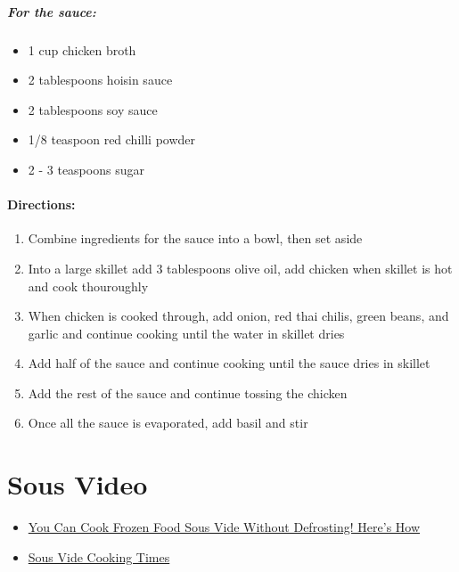 \documentclass[
]{article}
\providecommand{\tightlist}{%
  \setlength{\itemsep}{0pt}\setlength{\parskip}{0pt}}
\begin{document}
\hypertarget{for-the-sauce}{%
\subsubsection{For the sauce:}\label{for-the-sauce}}

\begin{itemize}
\tightlist
\item
  1 cup chicken broth
\item
  2 tablespoons hoisin sauce
\item
  2 tablespoons soy sauce
\item
  1/8 teaspoon red chilli powder
\item
  2 - 3 teaspoons sugar
\end{itemize}

\hypertarget{directions-1}{%
\subsection{Directions:}\label{directions-1}}

\begin{enumerate}
\def\labelenumi{\arabic{enumi}.}
\tightlist
\item
  Combine ingredients for the sauce into a bowl, then set aside
\item
  Into a large skillet add 3 tablespoons olive oil, add chicken when skillet is hot and cook thouroughly
\item
  When chicken is cooked through, add onion, red thai chilis, green beans, and garlic and continue cooking until the water in skillet dries
\item
  Add half of the sauce and continue cooking until the sauce dries in skillet
\item
  Add the rest of the sauce and continue tossing the chicken
\item
  Once all the sauce is evaporated, add basil and stir
\end{enumerate}

\hypertarget{part-sous-video}{%
\part{Sous Video}\label{part-sous-video}}

\begin{itemize}
\tightlist
\item
  \href{https://www.chefsteps.com/activities/you-can-cook-frozen-food-sous-vide-without-defrosting-here-s-how}{You Can Cook Frozen Food Sous Vide Without Defrosting! Here's How}
\item
  \href{https://www.chefsteps.com/activities/sous-vide-time-and-temperature-guide}{Sous Vide Cooking Times}
\end{itemize}
\end{document}
